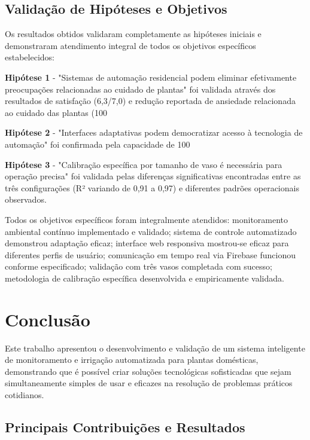 \section{Validação de Hipóteses e Objetivos}

Os resultados obtidos validaram completamente as hipóteses iniciais e demonstraram atendimento integral de todos os objetivos específicos estabelecidos:

\textbf{Hipótese 1} - "Sistemas de automação residencial podem eliminar efetivamente preocupações relacionadas ao cuidado de plantas" foi validada através dos resultados de satisfação (6,3/7,0) e redução reportada de ansiedade relacionada ao cuidado das plantas (100%

\textbf{Hipótese 2} - "Interfaces adaptativas podem democratizar acesso à tecnologia de automação" foi confirmada pela capacidade de 100%

\textbf{Hipótese 3} - "Calibração específica por tamanho de vaso é necessária para operação precisa" foi validada pelas diferenças significativas encontradas entre as três configurações (R² variando de 0,91 a 0,97) e diferentes padrões operacionais observados.

Todos os objetivos específicos foram integralmente atendidos: monitoramento ambiental contínuo implementado e validado; sistema de controle automatizado demonstrou adaptação eficaz; interface web responsiva mostrou-se eficaz para diferentes perfis de usuário; comunicação em tempo real via Firebase funcionou conforme especificado; validação com três vasos completada com sucesso; metodologia de calibração específica desenvolvida e empiricamente validada.

\chapter{Conclusão}

Este trabalho apresentou o desenvolvimento e validação de um sistema inteligente de monitoramento e irrigação automatizada para plantas domésticas, demonstrando que é possível criar soluções tecnológicas sofisticadas que sejam simultaneamente simples de usar e eficazes na resolução de problemas práticos cotidianos.

\section{Principais Contribuições e Resultados}

